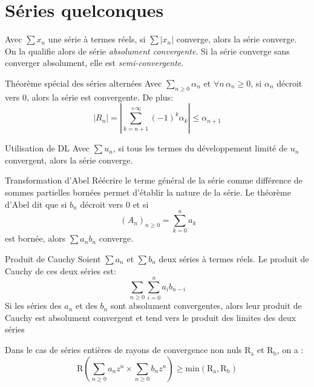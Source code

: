 \documentclass[french, a4paper, 11pt, twocolumn]{article}
\newcommand{\po}{\left(}         %
\newcommand{\pf}{\right)}        %
\newcommand{\pof}[1]{\po #1 \pf} %
\begin{document}
\section{Séries quelconques}
\begin{definition}
  Avec \(\sum x_{n}\) une série à termes  réels, si \(\sum\left| x_{n}\right|\) converge, alors la série converge. On la qualifie alors de série \emph{absolument convergente}. Si la série converge sans converger absolument, elle est \emph{semi-convergente}.
\end{definition}

\begin{theoreme}{Théorème spécial des séries alternées}
  Avec \(\sum_{n\geqslant 0} \alpha_{n}\) et \(\forall n\, \alpha_{n}\geqslant 0\),
  si \(\alpha_{n}\) décroit vers \(0\), alors la série est convergente.
  De plus: \[\left\lvert R_n \right\rvert =\left\lvert\sum_{k=n+1}^{+\infty}(-1)^k \alpha_{k}\right\rvert \leq \alpha_{n+1}\]
\end{theoreme}

\begin{theoreme}{Utilisation de DL}
  Avec \(\sum u_{n}\), si tous les termes du développement limité de \(u_{n}\) convergent, alors la série converge.
\end{theoreme}

\begin{theoreme}{Transformation d'Abel}
  Réécrire le terme général de la série comme différence de sommes partielles bornées permet d'établir la nature de la série.
  \tcblower
  Le théorème d'Abel dit que si \(b_{n}\) décroit vers \(0\) et si \[\ \pof{A_{n}}_{n\geqslant 0}=\sum_{k=0}^n a_k\] est bornée, alors \(\sum a_{n}b_{n}\) converge.
\end{theoreme}

\begin{theoreme}{Produit de Cauchy}
  Soient \(\sum a_{n}\) et \(\sum b_{n}\) deux séries à termes réels. Le produit de Cauchy de ces deux séries est:
  \[\sum_{n\geqslant 0}\sum_{i=0}^{n}a_{i}b_{n-i}\]
  Si les séries des \(a_{n}\) et des \(b_{n}\) sont absolument convergentes, alors leur produit de Cauchy est absolument convergent et tend vers le produit des limites des deux séries

  \tcblower
  Dans le cas de séries entières de rayons de convergence non nuls \(\mathrm{R_a}\) et \(\mathrm{R_b}\), on a :
    \[\mathrm{R}\left(\sum_{n\geq 0} a_{n}z^n \times \sum_{n\geq 0} b_{n}z^n\right) \geq \mathrm{min}\left(\mathrm{R_a,R_b}\right)\]
\end{theoreme}
\end{document}
